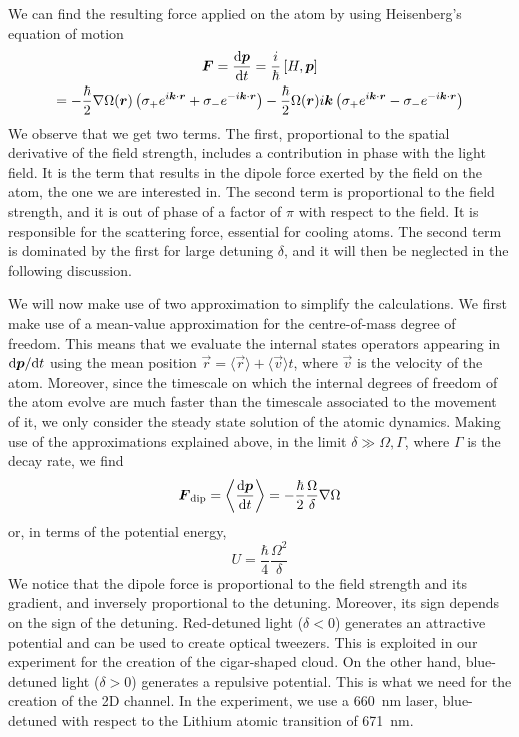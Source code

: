 We can find the resulting force applied on the atom by using Heisenberg's equation of motion
\begin{multline}
    \vec{F} = \frac{\differential\vec{p}}{\differential t} = \frac{i}{\hbar} \left[ H, \vec{p} \right] \\= - \frac{\hbar}{2} \nabla \Omega(\vec{r}) \left( \sigma_+ e^{i\vec{k}\cdot \vec{r}} +  \sigma_{-} e^{-i\vec{k}\cdot \vec{r} } \right) - \frac{\hbar
    }{2} \Omega(\vec{r}) i \vec{k} \left( \sigma_+ e^{i\vec{k}\cdot \vec{r}} -  \sigma_{-} e^{-i\vec{k}\cdot \vec{r} } \right)
\end{multline}
We observe that we get two terms. The first, proportional to the spatial derivative of the field strength, includes a contribution in phase with the light field. It is the term that results in the dipole force exerted by the field on the atom, the one we are interested in. The second term is proportional to the field strength, and it is out of phase of a factor of $\pi$ with respect to the field. It is responsible for the scattering force, essential for cooling atoms. The second term is dominated  by the first for large detuning $\delta$, and it will then be neglected in the following discussion.

We will now make use of two approximation to simplify the calculations. We first make use of a mean-value approximation for the centre-of-mass degree of freedom. This means that we evaluate the internal states operators appearing in $\differential \vec{p} / \differential t$ using the mean position $\vec{r} = \langle \vec{r} \rangle + \langle \vec{v} \rangle t$, where $\vec{v}$ is the velocity of the atom. Moreover, since the timescale on which the internal degrees of freedom of the atom evolve are much faster than the timescale associated to the movement of it, we only consider the steady state solution of the atomic dynamics.
Making use of the approximations explained above, in the limit $\delta  \gg \Omega, \Gamma$, where $\Gamma$ is the decay rate, we find
\begin{equation}
    \vec{F}_\text{dip} = \left\langle \frac{\differential \vec{p}}{\differential t} \right\rangle = - \frac{\hbar}{2} \frac{\Omega}{\delta} \nabla \Omega
\end{equation}
or, in terms of the potential energy,
\begin{equation}
    U = \frac{\hbar}{4}\frac{\Omega^2}{\delta}
\end{equation}
We notice that the dipole force is proportional to the field strength and its gradient, and inversely proportional to the detuning. Moreover, its sign depends on the sign of the detuning. Red-detuned light ($\delta < 0$) generates an attractive potential and can be used to create optical tweezers. This is exploited in our experiment for the creation of the cigar-shaped cloud. On the other hand, blue-detuned light ($\delta > 0$) generates a repulsive potential. This is what we need for the creation of the 2D channel. In the experiment, we use a \SI{660}{nm} laser, blue-detuned with respect to the Lithium atomic transition of \SI{671}{nm}.

